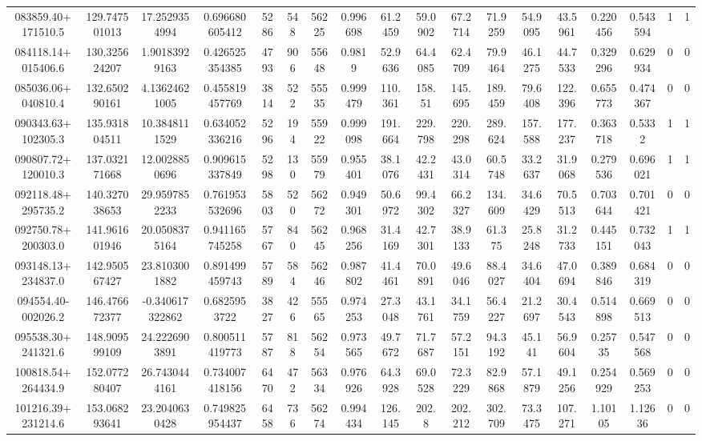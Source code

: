 \begin{table}
\begin{tabular}{cccccccccccccccccc}
083859.40+171510.5 & 129.747501013 & 17.2529354994 & 0.696680605412 & 5286 & 548 & 56225 & 0.996698 & 61.2459 & 59.0902 & 67.2714 & 71.9259 & 54.9095 & 43.5961 & 0.220456 & 0.543594 & 1 & 1 \\
084118.14+015406.6 & 130.325624207 & 1.90183929163 & 0.426525354385 & 4793 & 906 & 55648 & 0.9819 & 52.9636 & 64.4085 & 62.4709 & 79.9464 & 46.1275 & 44.7533 & 0.329296 & 0.629934 & 0 & 0 \\
085036.06+040810.4 & 132.650290161 & 4.13624621005 & 0.455819457769 & 3814 & 522 & 55535 & 0.999479 & 110.361 & 158.51 & 145.695 & 189.459 & 79.6408 & 122.396 & 0.655773 & 0.474367 & 0 & 0 \\
090343.63+102305.3 & 135.931804511 & 10.3848111529 & 0.634052336216 & 5296 & 194 & 55922 & 0.999098 & 191.664 & 229.798 & 220.298 & 289.624 & 157.588 & 177.237 & 0.363718 & 0.5332 & 1 & 1 \\
090807.72+120010.3 & 137.032171668 & 12.0028850696 & 0.909615337849 & 5298 & 130 & 55979 & 0.955401 & 38.1076 & 42.2431 & 43.0314 & 60.5748 & 33.2637 & 31.9068 & 0.279536 & 0.696021 & 1 & 1 \\
092118.48+295735.2 & 140.327038653 & 29.9597852233 & 0.761953532696 & 5803 & 520 & 56272 & 0.949301 & 50.6972 & 99.4302 & 66.2327 & 134.609 & 34.6429 & 70.5513 & 0.703644 & 0.701421 & 0 & 0 \\
092750.78+200303.0 & 141.961601946 & 20.0508375164 & 0.941165745258 & 5767 & 840 & 56245 & 0.968256 & 31.4169 & 42.7301 & 38.9133 & 61.375 & 25.8248 & 31.2733 & 0.445151 & 0.732043 & 1 & 1 \\
093148.13+234837.0 & 142.950567427 & 23.8103001882 & 0.891499459743 & 5789 & 584 & 56246 & 0.987802 & 41.4461 & 70.0891 & 49.6046 & 88.4027 & 34.6404 & 47.0694 & 0.389846 & 0.684319 & 0 & 0 \\
094554.40-002026.2 & 146.476672377 & -0.340617322862 & 0.6825953722 & 3827 & 426 & 55565 & 0.974253 & 27.3048 & 43.1761 & 34.1759 & 56.4227 & 21.2697 & 30.4543 & 0.514898 & 0.669513 & 0 & 0 \\
095538.30+241321.6 & 148.909599109 & 24.2226903891 & 0.800511419773 & 5787 & 818 & 56254 & 0.973565 & 49.7672 & 71.7687 & 57.2151 & 94.3192 & 45.141 & 56.9604 & 0.25735 & 0.547568 & 0 & 0 \\
100818.54+264434.9 & 152.077280407 & 26.7430444161 & 0.734007418156 & 6470 & 472 & 56334 & 0.976926 & 64.3928 & 69.0528 & 72.3229 & 82.9868 & 57.1879 & 49.1256 & 0.254929 & 0.569253 & 0 & 0 \\
101216.39+231214.6 & 153.068293641 & 23.2040630428 & 0.749825954437 & 6458 & 736 & 56274 & 0.994434 & 126.145 & 202.8 & 202.212 & 302.709 & 73.3475 & 107.271 & 1.10105 & 1.12636 & 0 & 0 \\

\end{tabular}
\end{table}
